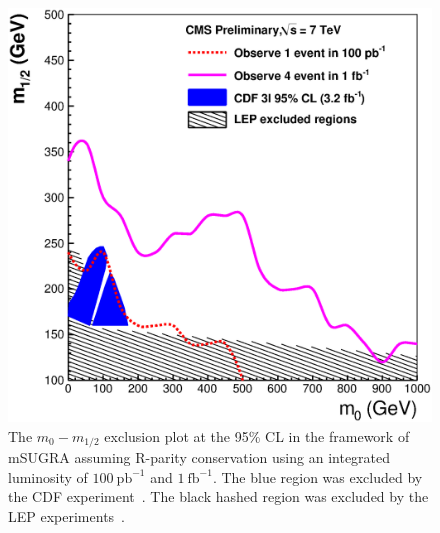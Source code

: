 \label{sec:tables}




\vspace{30 mm}
\begin{figure}[htb]
\begin{center}
\includegraphics[width=0.7\linewidth]{figs/exclusion1fbssa.eps}
\caption{The $m_{0}-m_{1/2}$ exclusion plot at the 95\% CL in the framework of
mSUGRA assuming R-parity conservation using an  integrated  luminosity of
$100~\mathrm{pb}^{-1}$ and $1~\mathrm{fb}^{-1}$. The blue region
was excluded by the CDF experiment~\cite{cdf:recentSusy}. The black hashed region was excluded by the LEP experiments~\cite{lep:lepsusyreach}.
\label{fig:ssadd_exclusion}}

\end{center}
\end{figure}



